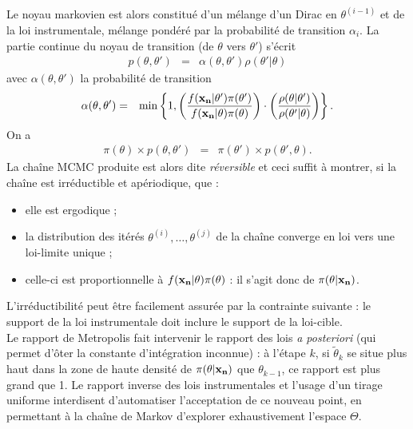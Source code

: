 \vspace{0.5cm}

Le noyau markovien est alors constitué d'un mélange d'un Dirac en $\theta^{(i-1)}$ et de la loi instrumentale, mélange pondéré par la probabilité de transition $\alpha_i$. La partie continue
du noyau de transition (de $\theta$ vers $\theta'$) s'écrit
\begin{eqnarray*}
p(\theta,\theta')  & = & \alpha(\theta,\theta')\rho(\theta'|\theta)
\end{eqnarray*}
avec $\alpha(\theta,\theta')$ la probabilité de transition
\begin{eqnarray*}
\alpha(\theta,\theta') & = & \min\left\{1,\left(\frac{f({\bf x_n}|\theta')\pi(\theta')}{f({\bf x_n}|{\theta})\pi(\theta)}\right)\cdot\left(\frac{\rho(\theta|\theta')}{\rho(\theta'|\theta)}\right)\right\}.
\end{eqnarray*}
On a  
\begin{eqnarray*}
\pi(\theta) \times p(\theta,\theta')  & = & \pi(\theta') \times p(\theta',\theta).
\end{eqnarray*} 
La chaîne MCMC produite est alors dite \emph{réversible} et ceci suffit à montrer, si la chaîne est irréductible et  apériodique, que :
\begin{itemize}
\item elle est ergodique ; 
\item la distribution des itérés $\theta^{(i)},\ldots,\theta^{(j)}$ de la chaîne converge en loi vers une loi-limite unique ; 
\item celle-ci est proportionnelle à $f({\bf x_n}|\theta)\pi(\theta)$ : il s'agit donc de $\pi(\theta|{\bf x_n})$.
\end{itemize}
L'irréductibilité peut être facilement assurée par la contrainte suivante : le support de la loi instrumentale doit inclure le support de la loi-cible. \\

Le rapport de Metropolis fait intervenir le rapport des lois {\it a posteriori} (qui permet d'\^oter la constante d'int\' egration inconnue) : à l'étape $k$, si $\tilde{\theta}_{k}$ se situe plus haut dans la  zone de haute densit\' e de $\pi(\theta|{\bf x_n})$ que $\theta_{k-1}$, ce rapport est plus grand que 1. Le rapport inverse des lois instrumentales et l'usage d'un tirage uniforme interdisent d'automatiser l'acceptation de ce nouveau point, en permettant \`a la cha\^ine de Markov d'explorer exhaustivement l'espace $\Theta$. \\




